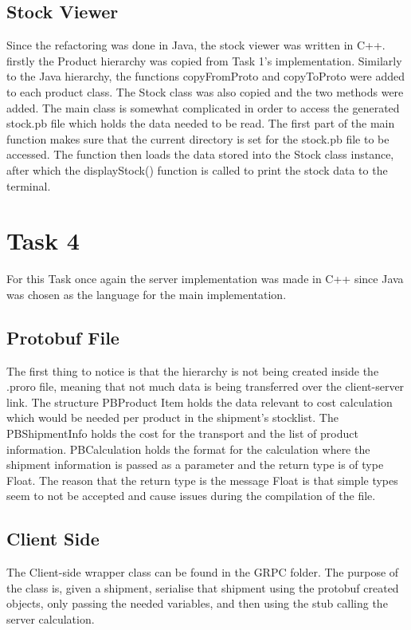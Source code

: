 \documentclass[12pt, a4paper]{report}
\begin{document}
\section{Stock Viewer}
Since the refactoring was done in Java, the stock viewer was written in C++. firstly the Product hierarchy was copied from Task 1's implementation. Similarly to the Java hierarchy, the functions copyFromProto and copyToProto were added to each product class. The Stock class was also copied and the two methods were added. The main class is somewhat complicated in order to access the generated stock.pb file which holds the data needed to be read. The first part of the main function makes sure that the current directory is set for the stock.pb file to be accessed. The function then loads the data stored into the Stock class instance, after which the displayStock() function is called to print the stock data to the terminal.

\chapter{Task 4}
For this Task once again the server implementation was made in C++ since Java was chosen as the language for the main implementation.

\section{Protobuf File}
The first thing to notice is that the hierarchy is not being created inside the .proro file, meaning that not much data is being transferred over the client-server link. The structure PBProduct Item holds the data relevant to cost calculation which would be needed per product in the shipment's stocklist. The PBShipmentInfo holds the cost for the transport and the list of product information. PBCalculation holds the format for the calculation where the shipment information is passed as a parameter and the return type is of type Float. The reason that the return type is the message Float is that simple types seem to not be accepted and cause issues during the compilation of the file.

\section{Client Side}
The Client-side wrapper class can be found in the GRPC folder. The purpose of the class is, given a shipment, serialise that shipment using the protobuf created objects, only passing the needed variables, and then using the stub calling the server calculation.
\end{document}
